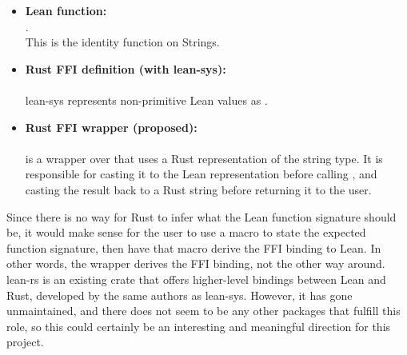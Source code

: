 \begin{itemize}
    \item \textbf{Lean function:}\\
    .
    \\
    This is the identity function on Strings.

    \item \textbf{Rust FFI definition (with lean-sys):}\\ 
    \\
    lean-sys represents non-primitive Lean values as .

    \item \textbf{Rust FFI wrapper (proposed):}\\ 
    \\
     is a wrapper over  that uses a Rust representation of the string type.  It is responsible for casting it to the Lean representation before calling , and casting the result back to a Rust string before returning it to the user.
\end{itemize}

Since there is no way for Rust to infer what the Lean function signature should be, it would make sense for the user to use a macro to state the expected function signature, then have that macro derive the FFI binding to Lean. In other words, the wrapper derives the FFI binding, not the other way around.
\\

lean-rs is an existing crate that offers higher-level bindings between Lean and Rust, developed by the same authors as lean-sys. However, it has gone unmaintained, and there does not seem to be any other packages that fulfill this role, so this could certainly be an interesting and meaningful direction for this project.
\\